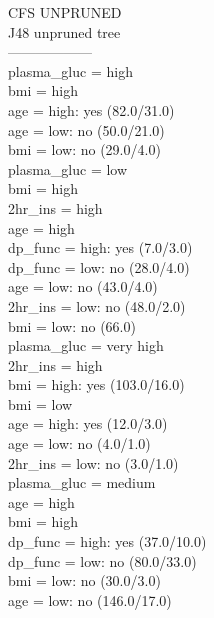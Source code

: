 \documentclass[12pt]{article}
\begin{document}
CFS UNPRUNED\\
J48 unpruned tree\\
------------------\\
plasma\_gluc = high\\
\textbar\quad   bmi = high\\
\textbar\quad   \textbar\quad   age = high: yes (82.0/31.0)\\
\textbar\quad   \textbar\quad   age = low: no (50.0/21.0)\\
\textbar\quad   bmi = low: no (29.0/4.0)\\
plasma\_gluc = low\\
\textbar\quad   bmi = high\\
\textbar\quad   \textbar\quad   2hr\_ins = high\\
\textbar\quad   \textbar\quad   \textbar\quad   age = high\\
\textbar\quad   \textbar\quad   \textbar\quad   \textbar\quad   dp\_func = high: yes (7.0/3.0)\\
\textbar\quad   \textbar\quad   \textbar\quad   \textbar\quad   dp\_func = low: no (28.0/4.0)\\
\textbar\quad   \textbar\quad   \textbar\quad   age = low: no (43.0/4.0)\\
\textbar\quad   \textbar\quad   2hr\_ins = low: no (48.0/2.0)\\
\textbar\quad   bmi = low: no (66.0)\\
plasma\_gluc = very high\\
\textbar\quad   2hr\_ins = high\\
\textbar\quad   \textbar\quad   bmi = high: yes (103.0/16.0)\\
\textbar\quad   \textbar\quad   bmi = low\\
\textbar\quad   \textbar\quad   \textbar\quad   age = high: yes (12.0/3.0)\\
\textbar\quad   \textbar\quad   \textbar\quad   age = low: no (4.0/1.0)\\
\textbar\quad   2hr\_ins = low: no (3.0/1.0)\\
plasma\_gluc = medium\\
\textbar\quad   age = high\\
\textbar\quad   \textbar\quad   bmi = high\\
\textbar\quad   \textbar\quad   \textbar\quad   dp\_func = high: yes (37.0/10.0)\\
\textbar\quad   \textbar\quad   \textbar\quad   dp\_func = low: no (80.0/33.0)\\
\textbar\quad   \textbar\quad   bmi = low: no (30.0/3.0)\\
\textbar\quad   age = low: no (146.0/17.0)\\
\end{document}
